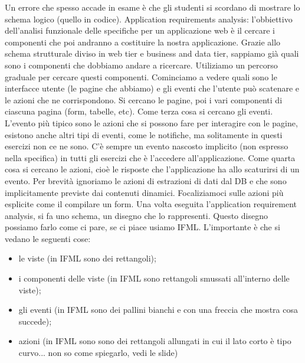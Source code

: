 Un errore che spesso accade in esame è che gli studenti si scordano di mostrare lo schema logico (quello in codice).\newline
\newline
Application requirements analysis: l'obbiettivo dell'analisi funzionale delle specifiche per un applicazione web è il cercare i componenti che poi andranno a costituire la nostra applicazione.\newline
Grazie allo schema strutturale diviso in web tier e business and data tier, sappiamo già quali sono i componenti che dobbiamo andare a ricercare.\newline
Utiliziamo un percorso graduale per cercare questi componenti.\newline
Cominciamo a vedere quali sono le interfacce utente (le pagine che abbiamo) e gli eventi che l'utente può scatenare e le azioni che ne corrispondono.\newline
Si cercano le pagine, poi i vari componenti di ciascuna pagina (form, tabelle, etc).\newline
Come terza cosa si cercano gli eventi. L'evento più tipico sono le azioni che si possono fare per interagire con le pagine, esistono anche altri tipi di eventi, come le notifiche, ma solitamente in questi esercizi non ce ne sono. C'è sempre un evento nascosto implicito (non espresso nella specifica) in tutti gli esercizi che è l'accedere all'applicazione.\newline
Come quarta cosa si cercano le azioni, cioè le risposte che l'applicazione ha allo scaturirsi di un evento. Per brevità ignoriamo le azioni di estrazioni di dati dal DB e che sono implicitamente previste dai contenuti dinamici. Focaliziamoci sulle azioni più esplicite come il compilare un form.\newline
\newline
Una volta eseguita l'application requirement analysis, si fa uno schema, un disegno che lo rappresenti. Questo disegno possiamo farlo come ci pare, se ci piace usiamo IFML. L'importante è che si vedano le seguenti cose:
\begin{itemize}
    \item le viste (in IFML sono dei rettangoli);
    \item i componenti delle viste (in IFML sono rettangoli smussati all'interno delle viste);
    \item gli eventi (in IFML sono dei pallini bianchi e con una freccia che mostra cosa succede);
    \item azioni (in IFML sono sono dei rettangoli allungati in cui il lato corto è tipo curvo... non so come spiegarlo, vedi le slide)
\end{itemize}
